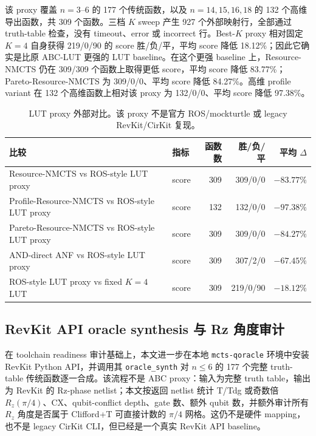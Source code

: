 \documentclass[UTF8,fontset=macnew,11pt]{ctexart}
\newcommand{\method}{Resource-NMCTS}
\begin{document}
该 proxy 覆盖 $n=3$--$6$ 的 177 个传统函数，以及 $n=14,15,16,18$ 的 132 个高维导出函数，共 309 个函数。三档 $K$ sweep 产生 927 个外部映射行，全部通过 truth-table 检查，没有 timeout、error 或 incorrect 行。Best-$K$ proxy 相对固定 $K=4$ 自身获得 219/0/90 的 score 胜/负/平，平均 score 降低 18.12\%；因此它确实是比原 ABC-LUT 更强的 LUT baseline。在这个更强 baseline 上，\method{} 仍在 309/309 个函数上取得更低 score，平均 score 降低 83.77\%；Pareto-\method{} 为 309/0/0、平均 score 降低 84.27\%。高维 profile variant 在 132 个高维函数上相对该 proxy 为 132/0/0、平均 score 降低 97.38\%。

\begin{table}[H]
\centering
\scriptsize
\caption{LUT proxy 外部对比。该 proxy 不是官方 ROS/mockturtle 或 legacy RevKit/CirKit 复现。}
\label{tab:ros-lut}
\begin{tabular}{llrrr}
\toprule
比较 & 指标 & 函数数 & 胜/负/平 & 平均 $\Delta$ \\
\midrule
\method{} vs ROS-style LUT proxy & score & 309 & 309/0/0 & $-83.77\%$ \\
Profile-\method{} vs ROS-style LUT proxy & score & 132 & 132/0/0 & $-97.38\%$ \\
Pareto-\method{} vs ROS-style LUT proxy & score & 309 & 309/0/0 & $-84.27\%$ \\
AND-direct ANF vs ROS-style LUT proxy & score & 309 & 307/2/0 & $-67.45\%$ \\
ROS-style LUT proxy vs fixed $K=4$ LUT & score & 309 & 219/0/90 & $-18.12\%$ \\
\bottomrule
\end{tabular}
\end{table}

\subsection{RevKit API oracle synthesis 与 Rz 角度审计}

在 toolchain readiness 审计基础上，本文进一步在本地 \texttt{mcts-qoracle} 环境中安装 RevKit Python API，并调用其 \texttt{oracle\_synth} 对 $n\leq6$ 的 177 个完整 truth-table 传统函数逐一合成。该流程不是 ABC proxy：输入为完整 truth table，输出为 RevKit 的 Rz-phase netlist；本文按返回 netlist 统计 T/Tdg 或奇数倍 $R_z(\pi/4)$、CX、qubit-conflict depth、gate 数、额外 qubit 数，并额外审计所有 $R_z$ 角度是否属于 Clifford+T 可直接计数的 $\pi/4$ 网格。这仍不是硬件 mapping，也不是 legacy CirKit CLI，但已经是一个真实 RevKit API baseline。
\end{document}
